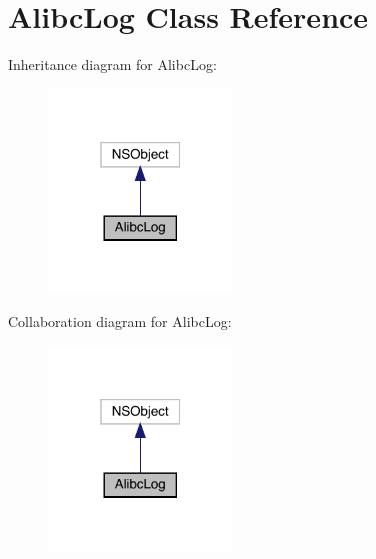 \hypertarget{interface_alibc_log}{}\section{Alibc\+Log Class Reference}
\label{interface_alibc_log}


Inheritance diagram for Alibc\+Log\+:\nopagebreak
\begin{figure}[H]
\begin{center}
\leavevmode
\includegraphics[width=139pt]{interface_alibc_log__inherit__graph}
\end{center}
\end{figure}


Collaboration diagram for Alibc\+Log\+:\nopagebreak
\begin{figure}[H]
\begin{center}
\leavevmode
\includegraphics[width=139pt]{interface_alibc_log__coll__graph}
\end{center}
\end{figure}
